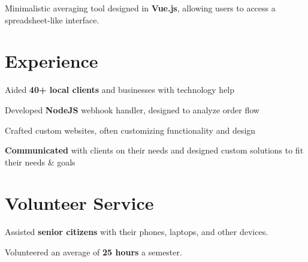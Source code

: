 \documentclass[letterpaper]{deedy-resume} %
\begin{document}
\begin{minipage}[t]{0.66\textwidth}
Minimalistic averaging tool designed in \textbf{Vue.js}, allowing users to access a spreadsheet-like interface.

\sectionspace %


\section{Experience}


\vspace{\topsep} %
\begin{tightitemize}
\item Aided \textbf{40+ local clients} and businesses with technology help
\item Developed \textbf{NodeJS} webhook handler, designed to analyze order flow
\item Crafted custom websites, often customizing functionality and design
\item \textbf{Communicated} with clients on their needs and designed custom solutions to fit their needs \& goals
\end{tightitemize}

\sectionspace %


\section{Volunteer Service}


\begin{tightitemize}
\item Assisted \textbf{senior citizens} with their phones, laptops, and other devices.
\item Volunteered an average of \textbf{25 hours} a semester.
\end{tightitemize}


\end{minipage}
\end{document}
